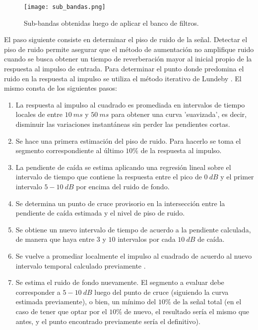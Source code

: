 \begin{figure}[H]
	\centering{}
	\texttt{[image: sub\_bandas.png]}
	\caption{Sub-bandas obtenidas luego de aplicar el banco de filtros.}
	\label{fig:sub_bandas}
\end{figure}

El paso siguiente consiste en determinar el piso de ruido de la señal. Detectar el piso de ruido permite asegurar que el método de aumentación no amplifique ruido cuando se busca obtener un tiempo de reverberación mayor al inicial propio de la respuesta al impulso de entrada. Para determinar el punto donde predomina el ruido en la respuesta al impulso se utiliza el método iterativo de Lundeby \cite{Lundeby}. El mismo consta de los siguientes pasos: 

\begin{enumerate}
\item La respuesta al impulso al cuadrado es promediada en intervalos de tiempo locales de entre $10 \ ms$ y $50 \ ms$ para obtener una curva 'suavizada', es decir, disminuir las variaciones instantáneas sin perder las pendientes cortas.

\item Se hace una primera estimación del piso de ruido. Para hacerlo se toma el segmento correspondiente al último $10\%$ de la respuesta al impulso.

\item La pendiente de caída se estima aplicando una regresión lineal sobre el intervalo de tiempo que contiene la respuesta entre el pico de $0 \ dB$ y el primer intervalo $5-10 \ dB$ por encima del ruido de fondo.

\item Se determina un punto de cruce provisorio en la intersección entre la pendiente de caída estimada y el nivel de piso de ruido.

\item Se obtiene un nuevo intervalo de tiempo de acuerdo a la pendiente calculada, de manera que haya entre $3$ y $10$ intervalos por cada $10 \ dB$ de caída.

\item Se vuelve a promediar localmente el impulso al cuadrado de acuerdo al nuevo intervalo temporal calculado previamente .

\item Se estima el ruido de fondo nuevamente. El segmento a evaluar debe corresponder a $5-10 \ dB$ luego del punto de cruce (siguiendo la curva estimada previamente), o bien, un mínimo del $10\%$ de la señal total (en el caso de tener que optar por el $10\%$ de nuevo, el resultado sería el mismo que antes, y el punto encontrado previamente sería el definitivo).


\end{enumerate}
